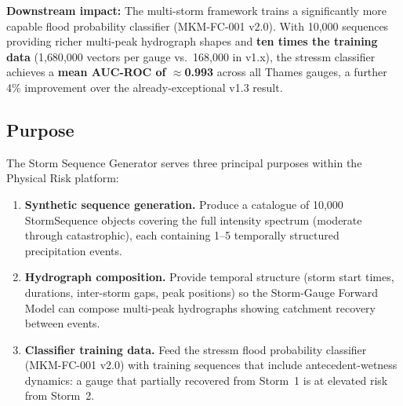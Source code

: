 \documentclass[11pt,a4paper]{article}
\begin{document}
\textbf{Downstream impact:} The multi-storm framework trains a significantly more capable
flood probability classifier (MKM-FC-001 v2.0). With 10{,}000 sequences providing richer
multi-peak hydrograph shapes and \textbf{ten times the training data} (1{,}680{,}000
vectors per gauge vs.\ 168{,}000 in v1.x), the stressm classifier achieves a
\textbf{mean AUC-ROC of $\approx$0.993} across all Thames gauges, a further 4\%
improvement over the already-exceptional v1.3 result.

\mkmpurpose

\subsection{Purpose}
The Storm Sequence Generator serves three principal purposes within the Physical Risk
platform:

\begin{enumerate}[nosep]
  \item \textbf{Synthetic sequence generation.} Produce a catalogue of 10{,}000
        StormSequence objects covering the full intensity spectrum (moderate through
        catastrophic), each containing 1--5 temporally structured precipitation events.
  \item \textbf{Hydrograph composition.} Provide temporal structure (storm start times,
        durations, inter-storm gaps, peak positions) so the Storm-Gauge Forward Model
        can compose multi-peak hydrographs showing catchment recovery between events.
  \item \textbf{Classifier training data.} Feed the stressm flood probability classifier
        (MKM-FC-001 v2.0) with training sequences that include antecedent-wetness dynamics:
        a gauge that partially recovered from Storm~1 is at elevated risk from Storm~2.
\end{enumerate}
\end{document}
